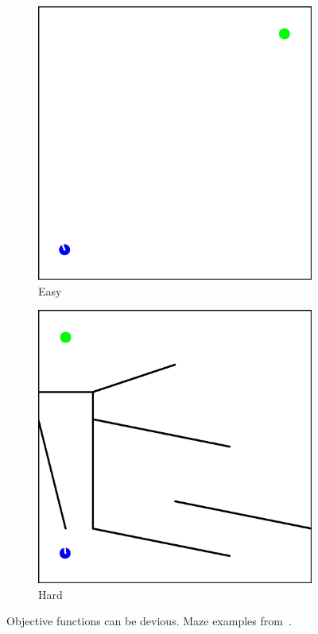 \begin{figure}[t!]
\centering
\begin{subfigure}[b]{0.3\textwidth}
\includegraphics[width=1.0\textwidth]{../Figures/Misc/MazeEasy.jpg}
\caption{Easy}
\label{fig:mazeEasy}
\end{subfigure}\hspace{2cm} 
\begin{subfigure}[b]{0.3\textwidth} 
\includegraphics[width=1.0\textwidth]{../Figures/Misc/MazeHard.jpg}
\caption{Hard}
\label{fig:mazeHard}
\end{subfigure}
\caption{Objective functions can be devious. Maze examples from~\cite{lehman2011abandoning}.}
\label{fig:maze}
\end{figure}

